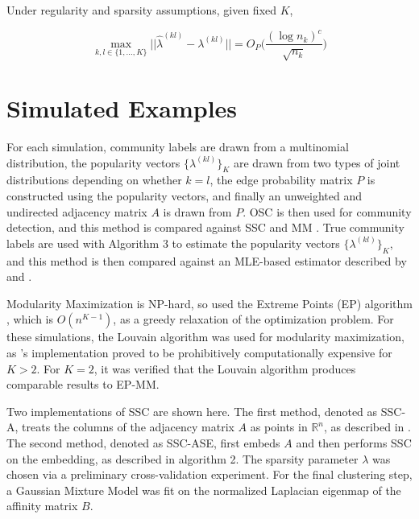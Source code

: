 \documentclass[12pt]{article}
\begin{document}
\begin{theorem}
\label{theorem6}
Under regularity and sparsity assumptions, given fixed $K$, 

\begin{equation} \label{eq:thm6}
\max_{k, l \in \{1, ..., K\}} 
||\hat{\lambda}^{(kl)} - \lambda^{(kl)}|| = 
O_P \bigg(\frac{(\log n_k)^c}{\sqrt{n_k}} \bigg)
\end{equation}
\end{theorem}

\hypertarget{simulated-examples}{%
\section{Simulated Examples}\label{simulated-examples}}

For each simulation, community labels are drawn from a multinomial
distribution, the popularity vectors \(\{\lambda^{(kl)}\}_K\) are drawn
from two types of joint distributions depending on whether \(k = l\),
the edge probability matrix \(P\) is constructed using the popularity
vectors, and finally an unweighted and undirected adjacency matrix \(A\)
is drawn from \(P\). OSC is then used for community detection, and this
method is compared against SSC \cite{noroozi2019estimation,soltanolkotabi2014}
and MM \cite{igraph}
\cite{307cbeb9b1be48299388437423d94bf1}. True community labels are used
with Algorithm 3 to estimate the popularity vectors
\(\{\lambda^{(kl)}\}_K\), and this method is then compared against an
MLE-based estimator described by \citeauthor{noroozi2019estimation} and
\citeauthor{307cbeb9b1be48299388437423d94bf1}.

Modularity Maximization is NP-hard, so
\citeauthor{307cbeb9b1be48299388437423d94bf1} used the Extreme Points
(EP) algorithm \cite{le2016}, which is \(O(n^{K - 1})\), as a greedy
relaxation of the optimization problem. For these simulations, the
Louvain algorithm was used for modularity maximization,
as \citeauthor{307cbeb9b1be48299388437423d94bf1}'s implementation proved to be
prohibitively computationally expensive for \(K > 2\). For \(K = 2\), it
was verified that the Louvain algorithm produces comparable results
to EP-MM.

Two implementations of SSC are shown here. The first method, denoted as
SSC-A, treats the columns of the adjacency matrix \(A\) as points in
\(\mathbb{R}^n\), as described in \citeauthor{noroozi2019estimation}.
The second method, denoted as SSC-ASE, first embeds \(A\) and then
performs SSC on the embedding, as described in algorithm 2. The sparsity
parameter \(\lambda\) was chosen via a preliminary cross-validation
experiment. For the final clustering step, a Gaussian Mixture Model was
fit on the normalized Laplacian eigenmap of the affinity matrix \(B\).
\end{document}

